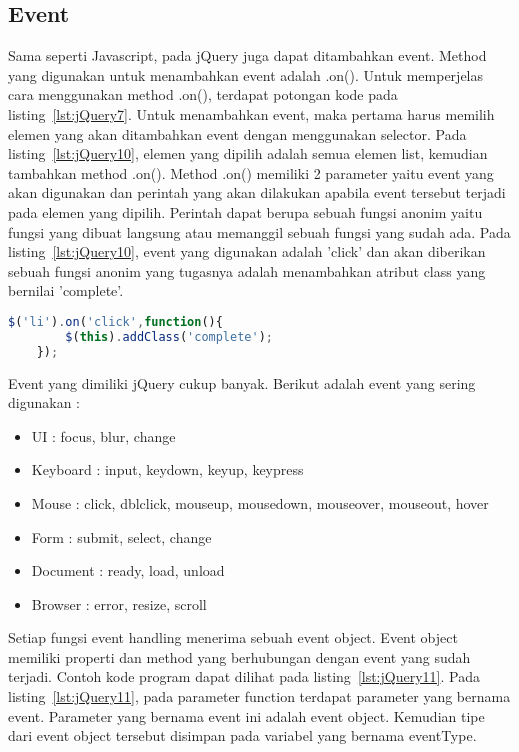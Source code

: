 \subsection{Event}
Sama seperti Javascript, pada jQuery juga dapat ditambahkan event. Method yang digunakan untuk menambahkan event adalah .on(). Untuk memperjelas cara menggunakan method .on(), terdapat potongan kode pada listing~\ref{lst:jQuery7}. Untuk menambahkan event, maka pertama harus memilih elemen yang akan ditambahkan event dengan menggunakan selector. Pada listing~\ref{lst:jQuery10}, elemen yang dipilih adalah semua elemen list, kemudian tambahkan method .on(). Method .on() memiliki 2 parameter yaitu event yang akan digunakan dan perintah yang akan dilakukan apabila event tersebut terjadi pada elemen yang dipilih. Perintah dapat berupa sebuah fungsi anonim yaitu fungsi yang dibuat langsung atau memanggil sebuah fungsi yang sudah ada. Pada listing~\ref{lst:jQuery10}, event yang digunakan adalah 'click' dan akan diberikan sebuah fungsi anonim yang tugasnya adalah menambahkan atribut class yang bernilai 'complete'. 

\begin{lstlisting}[language=Javascript, caption=Menambahkan atribut class pada setiap list menggunakan event 'click', label={lst:jQuery10}]
	$('li').on('click',function(){
		$(this).addClass('complete');
	});
\end{lstlisting}

Event yang dimiliki jQuery cukup banyak. Berikut adalah event yang sering digunakan :
\begin{itemize}
	\item UI : focus, blur, change
	\item Keyboard : input, keydown, keyup, keypress
	\item Mouse : click, dblclick, mouseup, mousedown, mouseover, mouseout, hover
	\item Form : submit, select, change
	\item Document : ready, load, unload
	\item Browser : error, resize, scroll
\end{itemize}

Setiap fungsi event handling menerima sebuah event object. Event object memiliki properti dan method yang berhubungan dengan event yang sudah terjadi. Contoh kode program dapat dilihat pada listing~\ref{lst:jQuery11}. Pada listing~\ref{lst:jQuery11}, pada parameter function terdapat parameter yang bernama event. Parameter yang bernama event ini adalah event object. Kemudian tipe dari event object tersebut disimpan pada variabel yang bernama eventType. 

